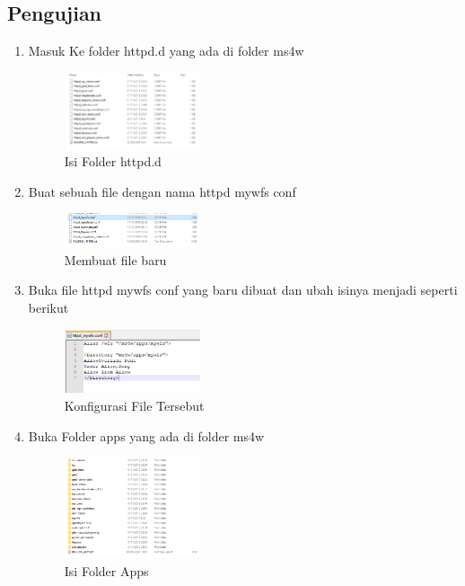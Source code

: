 \subsection{Pengujian}
\begin{enumerate}
  \item Masuk Ke folder httpd.d yang ada di folder ms4w
  \hfill\break
    \begin{figure}[H]
		\includegraphics[width=4cm]{figures/Tugas4/1174089/11.png}
		\centering
		\caption{Isi Folder httpd.d}
    \end{figure}
  \item Buat sebuah file dengan nama httpd mywfs conf
  \hfill\break
    \begin{figure}[H]
		\includegraphics[width=4cm]{figures/Tugas4/1174089/12.png}
		\centering
		\caption{Membuat file baru}
    \end{figure}
  \item Buka file httpd mywfs conf yang baru dibuat dan ubah isinya menjadi seperti berikut
  \hfill\break
    \begin{figure}[H]
		\includegraphics[width=4cm]{figures/Tugas4/1174089/13.png}
		\centering
		\caption{Konfigurasi File Tersebut}
    \end{figure}
  \item Buka Folder apps yang ada di folder ms4w
  \hfill\break
    \begin{figure}[H]
		\includegraphics[width=4cm]{figures/Tugas4/1174089/14.png}
		\centering
		\caption{Isi Folder Apps}
    \end{figure}

\end{enumerate}
